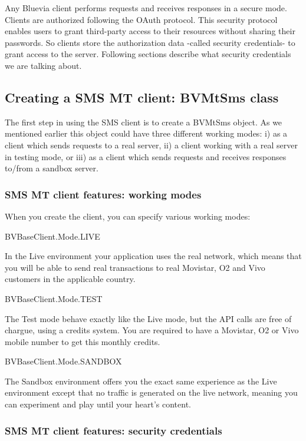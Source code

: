Any Bluevia client performs requests and receives responses in a secure mode. Clients are authorized following the OAuth protocol. This security protocol enables users to grant third-\/party access to their resources without sharing their passwords. So clients store the authorization data -\/called security credentials-\/ to grant access to the server. Following sections describe what security credentials we are talking about.\hypertarget{blv_sms_mt_guide_creating_a_sms_mt_client_sec}{}\subsection{Creating a SMS MT client: BVMtSms class}\label{blv_sms_mt_guide_creating_a_sms_mt_client_sec}
The first step in using the SMS client is to create a BVMtSms object. As we mentioned earlier this object could have three different working modes: i) as a client which sends requests to a real server, ii) a client working with a real server in testing mode, or iii) as a client which sends requests and receives responses to/from a sandbox server.\hypertarget{blv_sms_mt_guide_sms_mt_client_features_working_modes_sec}{}\subsubsection{SMS MT client features: working modes}\label{blv_sms_mt_guide_sms_mt_client_features_working_modes_sec}
When you create the client, you can specify various working modes: 
\begin{DoxyItemize}
\item BVBaseClient.Mode.LIVE \par
In the Live environment your application uses the real network, which means that you will be able to send real transactions to real Movistar, O2 and Vivo customers in the applicable country.


\item BVBaseClient.Mode.TEST \par
The Test mode behave exactly like the Live mode, but the API calls are free of chargue, using a credits system. You are required to have a Movistar, O2 or Vivo mobile number to get this monthly credits.


\item BVBaseClient.Mode.SANDBOX \par
The Sandbox environment offers you the exact same experience as the Live environment except that no traffic is generated on the live network, meaning you can experiment and play until your heart’s content. 
\end{DoxyItemize}\hypertarget{blv_sms_mt_guide_sms_mt_client_features_security_credentials}{}\subsubsection{SMS MT client features: security credentials}\label{blv_sms_mt_guide_sms_mt_client_features_security_credentials}
